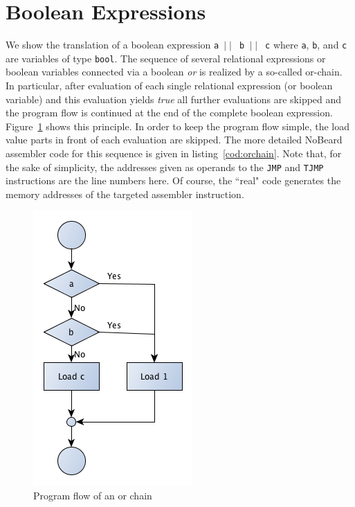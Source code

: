 \documentclass[11pt]{report}
\newcommand{\leongage}{NoBeard}
\begin{document}
\section{Boolean Expressions}
We show the translation of a boolean expression {\tt a $\mid \mid$ b $\mid \mid$ c} where {\tt a}, {\tt b}, and {\tt c} are variables of type {\tt bool}. The sequence of several relational expressions or boolean variables connected via a boolean {\em or} is realized by a so-called or-chain. In particular, after evaluation of each single relational expression (or boolean variable) and this evaluation yields {\em true} all further evaluations are skipped and the program flow is continued at the end of the complete boolean expression. Figure~\ref{fig:orchain} shows this principle. In order to keep the program flow simple, the load value parts in front of each evaluation are skipped. The more detailed \leongage{} assembler code for this sequence is given in listing~\ref{cod:orchain}. Note that, for the sake of simplicity, the addresses given as operands to the {\tt JMP} and {\tt TJMP} instructions are the line numbers here. Of course, the ``real" code generates the memory addresses of the targeted assembler instruction.

\begin{figure}
\begin{center}
\includegraphics[scale=.5]{images/OrChain.png}
\end{center}
\caption{Program flow of an or chain}
\label{fig:orchain}
\end{figure}
\end{document}
